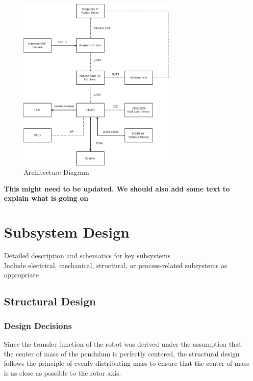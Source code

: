 \documentclass{article}
\begin{document}
\begin{figure}[H]
    \centering
    \includegraphics[width=0.7\textwidth]{Figures/Architecture_Diagram.png}
    \caption{Architecture Diagram}
    \label{fig:architecture_diagram}
\end{figure}

\textbf{This might need to be updated. We should also add some text to explain what is going on}

\section{Subsystem Design}
Detailed description and schematics for key subsystems \\
Include electrical, mechanical, structural, or process-related subsystems as appropriate

\subsection{Structural Design}

\subsubsection{Design Decisions}
Since the transfer function of the robot was derived under the assumption that
the center of mass of the pendulum is perfectly centered, the structural design
follows the principle of evenly distributing mass to ensure that the center of
mass is as close as possible to the rotor axis.
\end{document}
